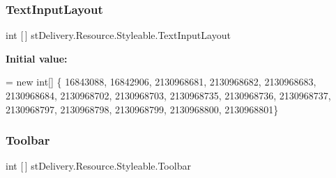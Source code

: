 \subsubsection{\texorpdfstring{Text\+Input\+Layout}{TextInputLayout}}
{\footnotesize\ttfamily int \mbox{[}$\,$\mbox{]} st\+Delivery.\+Resource.\+Styleable.\+Text\+Input\+Layout\hspace{0.3cm}{\ttfamily [static]}}

{\bfseries Initial value\+:}
\begin{DoxyCode}
= \textcolor{keyword}{new} \textcolor{keywordtype}{int}[] \{
                    16843088,
                    16842906,
                    2130968681,
                    2130968682,
                    2130968683,
                    2130968684,
                    2130968702,
                    2130968703,
                    2130968735,
                    2130968736,
                    2130968737,
                    2130968797,
                    2130968798,
                    2130968799,
                    2130968800,
                    2130968801\}
\end{DoxyCode}
\mbox{\label{classst_delivery_1_1_resource_1_1_styleable_a789ff333a353b2ce5eb28c6125b11ba6}} 
\subsubsection{\texorpdfstring{Toolbar}{Toolbar}}
{\footnotesize\ttfamily int \mbox{[}$\,$\mbox{]} st\+Delivery.\+Resource.\+Styleable.\+Toolbar\hspace{0.3cm}{\ttfamily [static]}}

